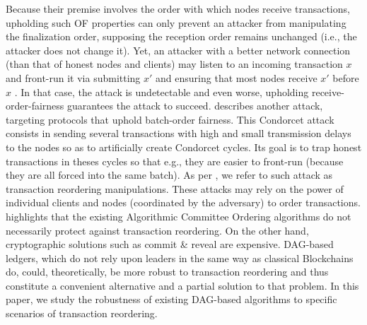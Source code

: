 


Because their premise involves the order with which nodes receive transactions, upholding such OF properties can only prevent an attacker from manipulating the finalization order, supposing the reception order remains unchanged (i.e., the attacker does not change it).
Yet, an attacker with a better network connection (than that of honest nodes and clients) may listen to an incoming transaction $x$ and front-run it via submitting $x'$ and ensuring that most nodes receive $x'$ before $x$ \cite{sok_preventing_transaction_reordering_manipulations_in_decentralized_finance}.
In that case, the attack is undetectable and even worse, upholding receive-order-fairness guarantees the attack to succeed.
\cite{condorcet_attack_against_fair_transaction_ordering} describes another attack, targeting protocols that uphold batch-order fairness.
This Condorcet attack consists in sending several transactions with high and small transmission delays to the nodes so as to artificially create Condorcet cycles. Its goal is to trap honest transactions in theses cycles so that e.g., they are easier to front-run (because they are all forced into the same batch).
As per \cite{sok_preventing_transaction_reordering_manipulations_in_decentralized_finance}, we refer to such attack as transaction reordering manipulations.
These attacks may rely on the power of individual clients and nodes (coordinated by the adversary) to order transactions.
\cite{condorcet_attack_against_fair_transaction_ordering} highlights that the existing Algorithmic Committee Ordering \cite{sok_preventing_transaction_reordering_manipulations_in_decentralized_finance} algorithms do not necessarily protect against transaction reordering.
On the other hand, cryptographic solutions such as commit \& reveal \cite{sok_preventing_transaction_reordering_manipulations_in_decentralized_finance,maximal_extractable_value_protection_on_a_DAG,fairness_notions_in_dag_based_dlts} are expensive.
DAG-based ledgers, which do not rely upon leaders in the same way as classical Blockchains do, could, theoretically, be more robust to transaction reordering and thus constitute a convenient alternative and a partial solution to that problem.
In this paper, we study the robustness of existing DAG-based algorithms to specific scenarios of transaction reordering.



